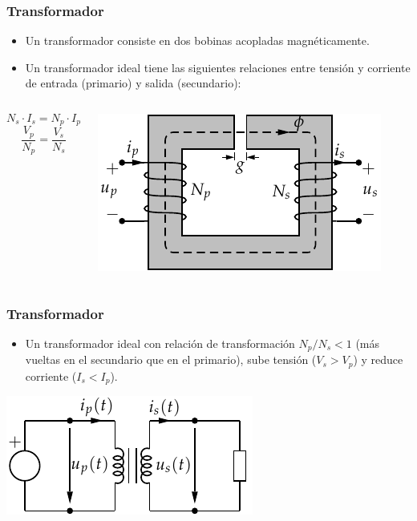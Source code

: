\documentclass[serif, xcolor=dvipsnames]{beamer}
\begin{document}
\begin{frame}
  \frametitle{Transformador}
  \begin{itemize}
  \item Un transformador consiste en dos bobinas acopladas
    magnéticamente.
  \item Un transformador ideal tiene las siguientes relaciones entre
    tensión y corriente de entrada (primario) y salida
    (secundario):\end{itemize}
  \begin{columns}[c]%


    \column{3cm}


\[
N_{s}\cdot I_{s}=N_{p}\cdot I_{p}
\]
\[
\frac{V_{p}}{N_{p}}=\frac{V_{s}}{N_{s}}
\]



\column{5cm}


\begin{center}
  \includegraphics[scale=0.9]{../figs/Transformador2}
  \par\end{center}


\end{columns}%

\end{frame}
\begin{frame}
  \frametitle{Transformador}
  \begin{itemize}
  \item Un transformador ideal con relación de transformación
    $N_{p}/N_{s}<1$ (más vueltas en el secundario que en el primario),
    sube tensión ($V_{s}>V_{p}$) y reduce corriente ($I_{s}<I_{p}$).
  \end{itemize}
  \begin{center}
    \includegraphics{../figs/Transformador}
    \par\end{center}


\end{frame}
\end{document}
